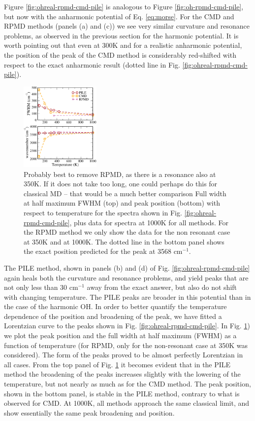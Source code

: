 \documentclass[aps,prb,superscriptaddress,amsmath,amssymb,showpacs,twocolumn]{revtex4}
\begin{document}
Figure \ref{fig:ohreal-rpmd-cmd-pile} is analogous to Figure \ref{fig:oh-rpmd-cmd-pile}, 
but now with the anharmonic potential of Eq. \ref{eq:morse}. 
For the CMD and RPMD methods (panels (a) and (c)) we
see very similar curvature and resonance problems, as observed in the 
previous section for the harmonic potential. 
It is worth pointing out that even at 300K and for a realistic anharmonic potential, 
the position of the peak of the CMD method is considerably red-shifted with respect 
to the exact anharmonic result (dotted line in Fig. \ref{fig:ohreal-rpmd-cmd-pile}). 

\begin{figure}[htbp]
\centering
\includegraphics[width=0.35\textwidth]{figures/ohreal_positionbroad.pdf}
\caption{{\color{red} Probably best to remove RPMD, as there is a resonance also at 350K.
If it does not take too long, one could perhaps do this for classical MD -- that would be
a much better comparison}
Full width at half maximum FWHM (top) and peak position (bottom) with respect 
to temperature for the spectra shown in Fig. \ref{fig:ohreal-rpmd-cmd-pile}, 
plus data for spectra at 1000K for all methods. For the RPMD method we only 
show the data for the non resonant case at 350K and at 1000K. The dotted line 
in the bottom panel shows the exact position predicted for the peak at 3568 cm$^{-1}$.}
\label{fig:ohreal-position-broad}
\end{figure}

The PILE method, shown in panels (b) and (d) of Fig. \ref{fig:ohreal-rpmd-cmd-pile} again heals both the curvature 
and resonance problems, and yield peaks that are not only less than 30 cm$^{-1}$ away from the exact answer, but 
also do not shift with changing temperature. The PILE peaks are broader in this potential than
in the case of the harmonic OH. In order to better quantify the temperature dependence of the position 
and broadening of the peak, we have fitted a Lorentzian curve to the peaks shown in Fig. 
\ref{fig:ohreal-rpmd-cmd-pile}. 
In Fig. \ref{fig:ohreal-position-broad}) we plot the peak position and the full 
width at half maximum (FWHM) as a function of temperature (for RPMD, only for the 
non-resonant case at 350K was considered). 
The form of the peaks proved to be almost perfectly Lorentzian in all cases. 
From the top panel of Fig. \ref{fig:ohreal-position-broad} it becomes evident that 
in the PILE method the broadening of the peaks increases slightly with the lowering 
of the temperature, but not nearly as much as for the CMD method. 
The peak position, shown in the bottom panel, is stable in the PILE method, contrary to
what is observed for CMD. At 1000K, all methods approach the same classical limit,
and show essentially the same peak broadening and position.
\end{document}
